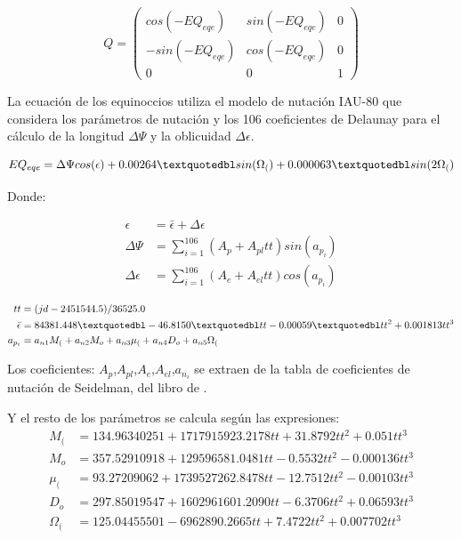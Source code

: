  \[ Q =
\left( \begin{array}{ccc}
 cos(-EQ_{eqe}) & sin(-EQ_{eqe}) &  0 \\ 
 -sin(-EQ_{eqe}) & cos(-EQ_{eqe}) &  0 \\
 0 & 0 & 1
\end{array} \right) \] 


La ecuaci\'on de los equinoccios utiliza el modelo de nutaci\'on IAU-80 que considera los par\'ametros de nutaci\'on y los 106 coeficientes de Delaunay para el c\'alculo de la longitud $\Delta \Psi$ y la oblicuidad $\Delta \epsilon$.

\begin{equation}
 EQ_{eqe}=\Delta \Psi cos({\epsilon}) + 0.00264 \textquotedbl sin(\Omega_{(}) + 0.000063 \textquotedbl sin (2 \Omega_{(})
\end{equation}

Donde:

\begin{align*}
 \epsilon &= {\bar{\epsilon}} + \Delta \epsilon\\
 \Delta \Psi &= \sum_{i=1}^{106}  (A_{p} + A_{pl} tt) sin(a_{p_{i}})\\
 \Delta \epsilon &= \sum_{i=1}^{106}  (A_{e} + A_{el} tt) cos(a_{p_{i}})
\end{align*}

\begin{align*}
tt &=(jd-2451544.5)/36525.0 \\
 {\bar{\epsilon}} &= 84381.448 \textquotedbl - 46.8150 \textquotedbl tt - 0.00059 \textquotedbl tt^{2} + 0.001813 tt^{3}\\
 a_{p_{i}} &= a_{n1}M_{(}+a_{n2}M_{o}+a_{n3}\mu_{(}+a_{n4}D_{o}+a_{n5}\Omega_{(}
\end{align*}

Los coeficientes: $A_{p}$,$A_{pl}$,$A_{e}$,$A_{el}$,$a_{n_{i}}$ se extraen de la tabla de coeficientes de nutaci\'on de Seidelman, del libro de  \citep{montenbruck2012satellite}.

Y el resto de los par\'ametros se calcula seg\'un las expresiones:\\

\begin{align*}
    M_{(} &  = 134.96340251+1717915923.2178 tt+31.8792 tt^{2}+0.051 tt^{3}\\
    M_{o} & = 357.52910918+129596581.0481 tt-0.5532 tt^{2}-0.000136 tt^{3}\\
    \mu_{(} &= 93.27209062+1739527262.8478 tt-12.7512 tt^{2}-0.00103 tt^{3}\\
    D_{o} & = 297.85019547+1602961601.2090 tt-6.3706 tt^{2}+0.06593 tt^{3}\\
    \Omega_{(} & = 125.04455501-6962890.2665 tt+7.4722 tt^{2}+0.007702tt^{3}
\end{align*}

